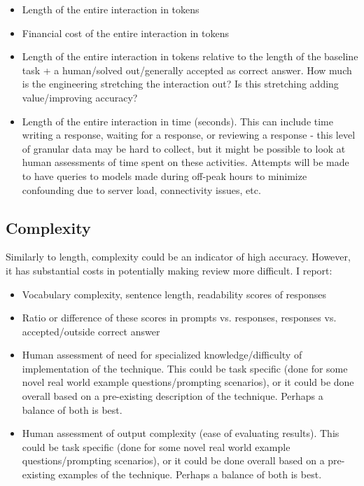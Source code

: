 \documentclass[11pt]{article}
\begin{document}
\begin{itemize}
  \item Length of the entire interaction in tokens
  \item Financial cost of the entire interaction in tokens
  \item Length of the entire interaction in tokens relative to the length of the baseline task + a human/solved out/generally accepted as correct answer. How much is the engineering stretching the interaction out? Is this stretching adding value/improving accuracy?
  \item Length of the entire interaction in time (seconds). This can include time writing a response, waiting for a response, or reviewing a response - this level of granular data may be hard to collect, but it might be possible to look at human assessments of time spent on these activities. Attempts will be made to have queries to models made during off-peak hours to minimize confounding due to server load, connectivity issues, etc.
\end{itemize}

\subsection*{Complexity}

Similarly to length, complexity could be an indicator of high accuracy. However, it has substantial costs in potentially making review more difficult. I report:

\begin{itemize}
  \item Vocabulary complexity, sentence length, readability scores of responses
  \item Ratio or difference of these scores in prompts vs. responses, responses vs. accepted/outside correct answer
  \item Human assessment of need for specialized knowledge/difficulty of implementation of the technique. This could be task specific (done for some novel real world example questions/prompting scenarios), or it could be done overall based on a pre-existing description of the technique. Perhaps a balance of both is best.
  \item Human assessment of output complexity (ease of evaluating results). This could be task specific (done for some novel real world example questions/prompting scenarios), or it could be done overall based on a pre-existing examples of the technique. Perhaps a balance of both is best.
\end{itemize}
\end{document}
